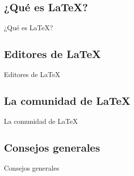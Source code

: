 \documentclass[../slides.tex]{subfiles}
\begin{document}
    \tableofcontents

    \subsection{¿Qué es \LaTeX{}?}
        
    \begin{frame}{¿Qué es \LaTeX{}?}

        
    \end{frame}

    \subsection{Editores de \LaTeX{}}

    \begin{frame}{Editores de \LaTeX{}}

        
    \end{frame}

    \subsection{La comunidad de \LaTeX{}}

    \begin{frame}{La comunidad de \LaTeX{}}

        
    \end{frame}

    \subsection{Consejos generales}

    \begin{frame}{Consejos generales}

        
    \end{frame}
\end{document}
